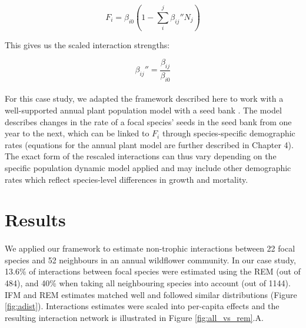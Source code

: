 \documentclass[a4,12pt]{article}
\begin{document}
        \begin{equation}
        F_{i} = \beta_{i0} \left ( 1 - \sum_{i}^{j} {\beta_{ij}}'' N_{j} \right )
        \label{LVform}
        \end{equation}

        This gives us the scaled interaction strengths: 
 
        \begin{equation}
        {\beta_{ij}}'' = \frac{\beta_{ij}}{\beta_{i0}}
        \label{scaling}
        \end{equation}

        \paragraph{}
		For this case study, we adapted the framework described here to work with a well-supported annual plant population model with a seed bank \parencite{Bimler2018}. The model describes changes in the rate of a focal species' seeds in the seed bank from one year to the next, which can be linked to $F_i$ through species-specific demographic rates (equations for the annual plant model are further described in Chapter 4). The exact form of the rescaled interactions can thus vary depending on the specific population dynamic model applied and may include other demographic rates which reflect species-level differences in growth and mortality.



\section{Results}

	\paragraph{} 
	We applied our framework to estimate non-trophic interactions between 22 focal species and 52 neighbours in an annual wildflower community. In our case study, 13.6\% of interactions between focal species were estimated using the REM (out of 484), and 40\% when taking all neighbouring species into account (out of 1144). IFM and REM estimates matched well and followed similar distributions (Figure \ref{fig:adist}). Interactions estimates were scaled into per-capita effects and the resulting interaction network is illustrated in Figure \ref{fig:all_vs_rem}.A.
\end{document}
